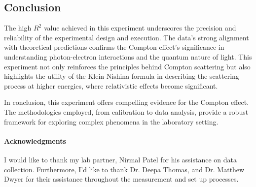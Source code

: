 \documentclass[10pt,letterpaper,onecolumn]{article}
\begin{document}
\subsection{Conclusion}
The high \(R^2\) value achieved in this experiment underscores the precision and reliability of the experimental design and execution. The data's strong alignment with theoretical predictions confirms the Compton effect's significance in understanding photon-electron interactions and the quantum nature of light. This experiment not only reinforces the principles behind Compton scattering but also highlights the utility of the Klein-Nishina formula in describing the scattering process at higher energies, where relativistic effects become significant.

In conclusion, this experiment offers compelling evidence for the Compton effect. The methodologies employed, from calibration to data analysis, provide a robust framework for exploring complex phenomena in the laboratory setting.


\paragraph*{Acknowledgments}
I would like to thank my lab partner, Nirmal Patel for his assistance on data collection. Furthermore, I'd like to thank Dr. Deepa Thomas, and Dr. Matthew Dwyer for their assistance throughout the measurement and set up processes. 
\newpage
 
 
\end{document}
